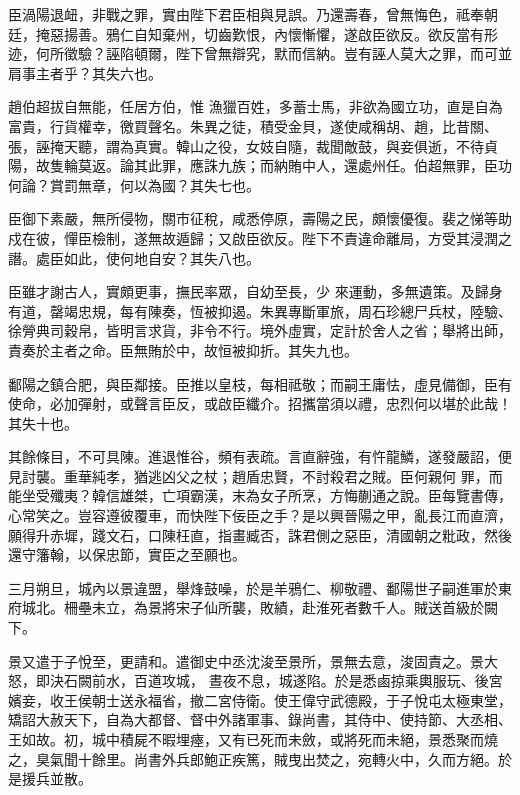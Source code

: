 \begin{pinyinscope}
 臣渦陽退衄，非戰之罪，實由陛下君臣相與見誤。乃還壽春，曾無悔色，祗奉朝廷，掩惡揚善。鴉仁自知棄州，切齒歎恨，內懷慚懼，遂啟臣欲反。欲反當有形迹，何所徵驗？誣陷頓爾，陛下曾無辯究，默而信納。豈有誣人莫大之罪，而可並肩事主者乎？其失六也。



 趙伯超拔自無能，任居方伯，惟
 漁獵百姓，多蓄士馬，非欲為國立功，直是自為富貴，行貨權幸，徼買聲名。朱異之徒，積受金貝，遂使咸稱胡、趙，比昔關、張，誣掩天聽，謂為真實。韓山之役，女妓自隨，裁聞敵鼓，與妾俱逝，不待貞陽，故隻輪莫返。論其此罪，應誅九族；而納賄中人，還處州任。伯超無罪，臣功何論？賞罰無章，何以為國？其失七也。



 臣御下素嚴，無所侵物，關市征稅，咸悉停原，壽陽之民，頗懷優復。裴之悌等助戍在彼，憚臣檢制，遂無故遁歸；又啟臣欲反。陛下不責違命離局，方受其浸潤之譖。處臣如此，使何地自安？其失八也。



 臣雖才謝古人，實頗更事，撫民率眾，自幼至長，少
 來運動，多無遺策。及歸身有道，罄竭忠規，每有陳奏，恆被抑遏。朱異專斷軍旅，周石珍總尸兵杖，陸驗、徐膋典司穀帛，皆明言求貨，非令不行。境外虛實，定計於舍人之省；舉將出師，責奏於主者之命。臣無賄於中，故恒被抑折。其失九也。



 鄱陽之鎮合肥，與臣鄰接。臣推以皇枝，每相祗敬；而嗣王庸怯，虛見備御，臣有使命，必加彈射，或聲言臣反，或啟臣纖介。招攜當須以禮，忠烈何以堪於此哉！其失十也。



 其餘條目，不可具陳。進退惟谷，頻有表疏。言直辭強，有忤龍鱗，遂發嚴詔，便見討襲。重華純孝，猶逃凶父之杖；趙盾忠賢，不討殺君之賊。臣何親何
 罪，而能坐受殲夷？韓信雄桀，亡項霸漢，末為女子所烹，方悔蒯通之說。臣每覽書傳，心常笑之。豈容遵彼覆車，而快陛下佞臣之手？是以興晉陽之甲，亂長江而直濟，願得升赤墀，踐文石，口陳枉直，指畫臧否，誅君側之惡臣，清國朝之粃政，然後還守籓翰，以保忠節，實臣之至願也。



 三月朔旦，城內以景違盟，舉烽鼓噪，於是羊鴉仁、柳敬禮、鄱陽世子嗣進軍於東府城北。柵壘未立，為景將宋子仙所襲，敗績，赴淮死者數千人。賊送首級於闕下。



 景又遣于子悅至，更請和。遣御史中丞沈浚至景所，景無去意，浚固責之。景大怒，即決石闕前水，百道攻城，
 晝夜不息，城遂陷。於是悉鹵掠乘輿服玩、後宮嬪妾，收王侯朝士送永福省，撤二宮侍衛。使王偉守武德殿，于子悅屯太極東堂，矯詔大赦天下，自為大都督、督中外諸軍事、錄尚書，其侍中、使持節、大丞相、王如故。初，城中積屍不暇埋瘞，又有已死而未斂，或將死而未絕，景悉聚而燒之，臭氣聞十餘里。尚書外兵郎鮑正疾篤，賊曳出焚之，宛轉火中，久而方絕。於是援兵並散。




\end{pinyinscope}
